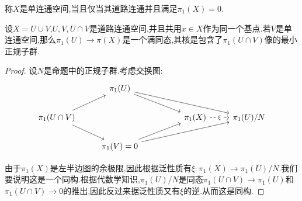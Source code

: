     \begin{definition}
        称$X$是单连通空间,当且仅当其道路连通并且满足$\pi_1(X)=0$.
    \end{definition}
    \begin{proposition}
        设$X =U \cup V$,$U,V,U\cap V$是道路连通空间,并且共用$x \in X$作为同一个基点.若$V$是单连通空间,那么$\pi_1(U)\to \pi(X)$是一个满同态,其核是包含了$\pi_1(U \cap V)$像的最小正规子群.
    \end{proposition}
    \begin{proof}
        设$N$是命题中的正规子群.考虑交换图:
        \[\begin{tikzcd}
                & {\pi_1(U)} \\
                {\pi_1(U\cap V)} &&& {\pi_1(X)} & {\pi_1(U)/N} \\
                & {\pi_1(V)=0}
                \arrow["\xi"{description}, dashed, from=2-4, to=2-5]
                \arrow[from=1-2, to=2-4]
                \arrow[from=2-1, to=1-2]
                \arrow[from=2-1, to=3-2]
                \arrow[from=3-2, to=2-4]
                \arrow[from=1-2, to=2-5]
                \arrow[from=3-2, to=2-5]
            \end{tikzcd}
        \]

        由于$\pi_1(X)$是左半边图的余极限,因此根据泛性质有$\xi:\pi_1(X)\to \pi_1(U)/N$.我们要说明这是一个同构.根据代数学知识,$\pi_1(U)/N$是同态$\pi_1(U \cap V)\to \pi_1(U)$和$\pi_1(U \cap V)\to 0$的推出,因此反过来据泛性质又有$\xi$的逆.从而这是同构.
    \end{proof}
